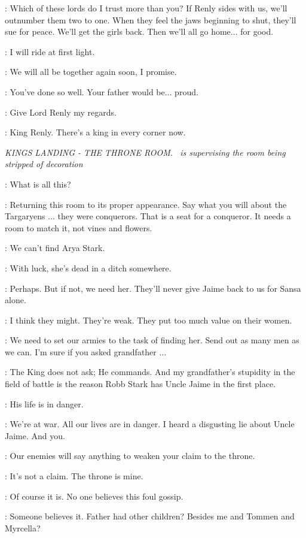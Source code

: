 \ROBB: Which of these lords do I trust more than you? If Renly sides with us, we'll outnumber them two to one. When they feel the jaws beginning to shut, they'll sue for peace. We'll get the girls back. Then we'll all go home$\ldots$ for good.

\CATELYN: I will ride at first light.

\ROBB: We will all be together again soon, I promise.

\CATELYN: You've done so well. Your father would be$\ldots$ proud.

\ROBB: Give Lord Renly my regards.

\CATELYN: King Renly. There's a king in every corner now.


\scene

\textit{KINGS LANDING - THE THRONE ROOM.  \JOFFREY ~is supervising the room being stripped of decoration}

\CERSEI: What is all this?

\JOFFREY: Returning this room to its proper appearance. Say what you will about the Targaryens $\ldots$ they were conquerors. That is a seat for a conqueror. It needs a room to match it, not vines and flowers.

\CERSEI: We can't find Arya Stark.

\JOFFREY: With luck, she's dead in a ditch somewhere.

\CERSEI: Perhaps. But if not, we need her. They'll never give Jaime back to us for Sansa alone.

\JOFFREY: I think they might. They're weak. They put too much value on their women.

\CERSEI: We need to set our armies to the task of finding her. Send out as many men as we can. I'm sure if you asked grandfather $\ldots$

\JOFFREY: The King does not ask; He commands. And my grandfather's stupidity in the field of battle is the reason Robb Stark has Uncle Jaime in the first place.

\CERSEI: His life is in danger.

\JOFFREY: We're at war. All our lives are in danger. I heard a disgusting lie about Uncle Jaime. And you.

\CERSEI: Our enemies will say anything to weaken your claim to the throne.

\JOFFREY: It's not a claim. The throne is mine.

\CERSEI: Of course it is. No one believes this foul gossip.

\JOFFREY: Someone believes it. Father had other children? Besides me and Tommen and Myrcella?

